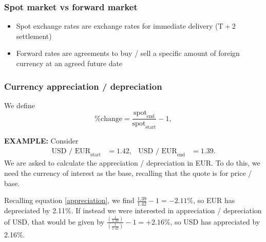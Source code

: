 \documentclass[../notes_compiled.tex]{subfiles}
\begin{document}
\subsubsection{Spot market vs forward market}
\begin{itemize}
\item Spot exchange rates are exchange rates for immediate delivery ($\text{T}+2$ settlement)
\item Forward rates are agreements to buy / sell a specific amount of foreign currency at an agreed future date
\end{itemize}

\subsubsection{Currency appreciation / depreciation}
\begin{itemize}
\item We define
\begin{equation}
\text{\% change} = \frac{\text{spot}_{\text{end}}}{\text{spot}_{\text{start}}}-1, \label{appreciation}
\end{equation}
{\color{RedViolet}
\item[] \textbf{EXAMPLE:} Consider
\begin{align*}
\text{USD / EUR}_{\text{start}} &= 1.42, &
\text{USD / EUR}_{\text{end}} &=  1.39.
\end{align*}
We are asked to calculate the appreciation / depreciation in EUR. To do this, we need the currency of interest as the base, recalling that the quote is for price / base.
}
{\color{RoyalBlue}
\item[] Recalling equation \ref{appreciation}, we find $\frac{1.39}{1.42}-1=-2.11\%$, so EUR has depreciated by 2.11\%. If instead we were interested in appreciation / depreciation of USD, that would be given by $\frac{\left(\frac{1}{1.39}\right)}{\left(\frac{1}{1.42}\right)}-1 = +2.16\%$, so USD has appreciated by 2.16\%.
}
\end{itemize}
\end{document}
